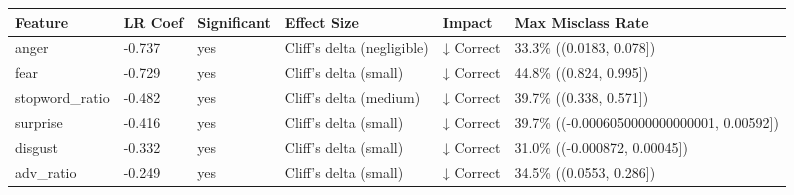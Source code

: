 \begin{tabular}{llllll}
\toprule
Feature & LR Coef & Significant & Effect Size & Impact & Max Misclass Rate \\
\midrule
anger & -0.737 & yes & Cliff's delta (negligible) & ↓ Correct & 33.3\% ((0.0183, 0.078]) \\
fear & -0.729 & yes & Cliff's delta (small) & ↓ Correct & 44.8\% ((0.824, 0.995]) \\
stopword\_ratio & -0.482 & yes & Cliff's delta (medium) & ↓ Correct & 39.7\% ((0.338, 0.571]) \\
surprise & -0.416 & yes & Cliff's delta (small) & ↓ Correct & 39.7\% ((-0.0006050000000000001, 0.00592]) \\
disgust & -0.332 & yes & Cliff's delta (small) & ↓ Correct & 31.0\% ((-0.000872, 0.00045]) \\
adv\_ratio & -0.249 & yes & Cliff's delta (small) & ↓ Correct & 34.5\% ((0.0553, 0.286]) \\
\bottomrule
\end{tabular}
